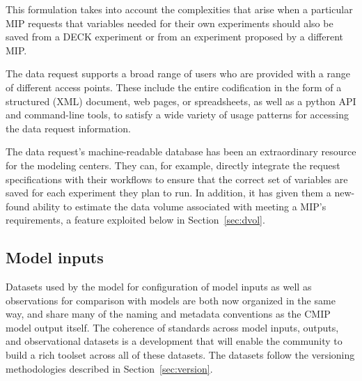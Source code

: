 \documentclass[gmd,manuscript]{copernicus}
\begin{document}
This formulation takes into account the complexities that arise when a
particular MIP requests that variables needed for their own
experiments should also be saved from a DECK experiment or from an
experiment proposed by a different MIP.

The data request supports a broad range of users who are 
provided with a range of different access points. These include the
entire codification in the form of a structured (XML) document, web
pages, or spreadsheets, as well as a python API and command-line tools,
to satisfy a wide variety of usage patterns for accessing 
the data request information.


The data request's machine-readable database has been an extraordinary
resource for the modeling centers. They can, for example, directly
integrate the request specifications with their workflows to ensure
that the correct set of variables are saved for each experiment they
plan to run. In addition, it has given them a new-found ability to
estimate the data volume associated with meeting a MIP's requirements,
a feature exploited below in Section~\ref{sec:dvol}.

\subsection{Model inputs}
\label{sec:data-inputs}

Datasets used by the model for configuration of model inputs
\citep[\texttt{input4MIPs}, see][]{ref:duracketal2018} as well as
observations for comparison with models \citep[\texttt{obs4MIPs},
see][]{ref:teixeiraetal2014,ref:ferraroetal2015} are both now
organized in the same way, and share many of the naming and metadata
conventions as the CMIP model output itself.
The coherence of standards across model inputs, outputs, and
observational datasets is a development that will enable the community
to build a rich toolset across all of these datasets. The datasets
follow the versioning methodologies described in Section~\ref{sec:version}.
\end{document}

